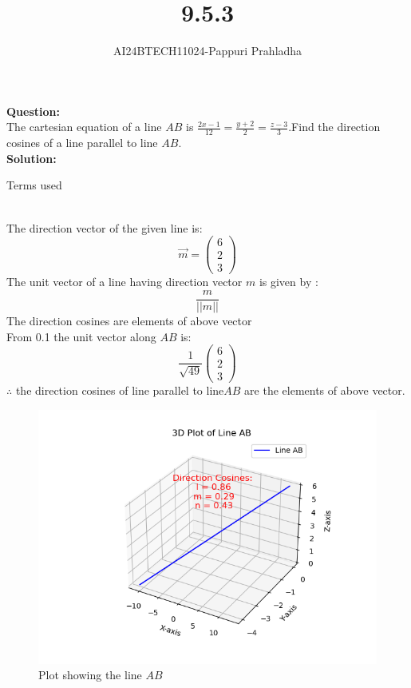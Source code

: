 \documentclass[journal]{IEEEtran}
\begin{document}

\vspace{3cm}

\title{9.5.3}
\author{AI24BTECH11024-Pappuri Prahladha}
{\let\newpage\relax\maketitle}

\renewcommand{\thefigure}{\theenumi}
\renewcommand{\thetable}{\theenumi}
\setlength{\intextsep}{10pt} %


\renewcommand{\thetable}{\theenumi}


\textbf{Question:}\\
The cartesian equation of a line $AB$ is $\frac{2x-1}{12}=\frac{y+2}{2}=\frac{z-3}{3}$.Find the direction cosines of a line parallel to line $AB$.
\\
\textbf{Solution: }\\
\begin{table}[h!]
    \renewcommand{\thetable}{1}
    \centering
    
    \caption{Terms used}
    \label{TABLE 1:}
\end{table}\\
The direction vector of the given line is$\colon$
\begin{equation*}
    \vec{m}=\begin{pmatrix}
        6\\
        2\\
        3
    \end{pmatrix}
\end{equation*}
The unit vector of a line having direction vector $m$ is given by $\colon$
\begin{equation}
    \frac{m}{||m||}
\end{equation}
The direction cosines are elements of above vector  \\
From 0.1 the unit vector along $AB$ is$\colon$\\
\begin{equation}
\frac{1}{\sqrt{49}}\begin{pmatrix}
    6\\
    2\\
    3
\end{pmatrix}
\end{equation}
$\therefore$ the direction cosines of line parallel to line$AB$ are the elements of above vector.
 \begin{figure}[h!]
   \centering
   \includegraphics[width=0.7\linewidth]{figs/figure1.png}
   \caption{Plot showing the line $AB$}
   \label{stemplot}
\end{figure}
\end{document}
